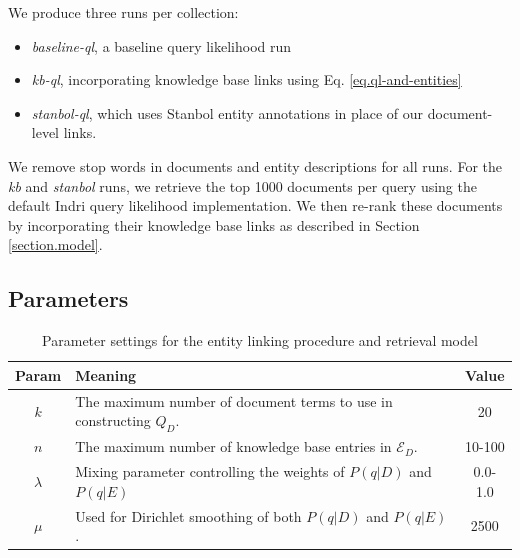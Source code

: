 \documentclass{sig-alternate}
\begin{document}
We produce three runs per collection:
\begin{itemize}
	\item \textit{baseline-ql}, a baseline query likelihood run
	\item \textit{kb-ql}, incorporating knowledge base links using Eq. \ref{eq.ql-and-entities}
	\item \textit{stanbol-ql}, which uses Stanbol entity annotations in place of our document-level links.
\end{itemize}

We remove stop words in documents and entity descriptions for all runs. For the \textit{kb} and \textit{stanbol} runs, we retrieve the top 1000 documents per query using the default Indri query likelihood implementation. We then re-rank these documents by incorporating their knowledge base links as described in Section \ref{section.model}.

\subsection{Parameters}\label{section.evaluation.parameters}

\begin{table}[htb]
\centering
\begin{tabular}{|c|p{}|c|} \hline
{\bf Param} & {\bf Meaning} & {\bf Value} \\ \hline
$k$ & The maximum number of document terms to use in constructing $Q_D$. & 20 \\ \hline
$n$ & The maximum number of knowledge base entries in $\mathcal{E}_D$. & 10-100 \\ \hline
$\lambda$ & Mixing parameter controlling the weights of $P(q|D)$ and $P(q|E)$ & 0.0-1.0 \\ \hline
$\mu$ & Used for Dirichlet smoothing of both $P(q|D)$ and $P(q|E)$. & 2500 \\ \hline
\end{tabular}
\caption{Parameter settings for the entity linking procedure and retrieval model}
\label{table.parameters}
\end{table}
\end{document}
